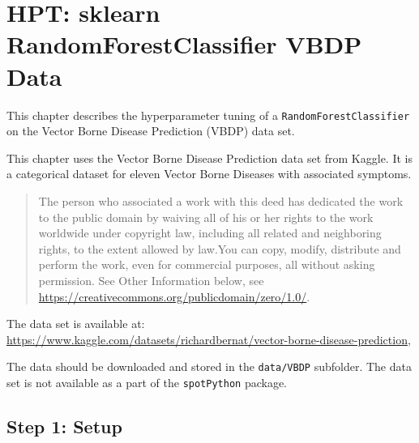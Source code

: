 \documentclass[
  letterpaper,
  DIV=11,
  numbers=noendperiod]{scrreprt}
\begin{document}
\hypertarget{sec-hpt-random-forest-classifier}{%
\chapter{HPT: sklearn RandomForestClassifier VBDP
Data}\label{sec-hpt-random-forest-classifier}}

This chapter describes the hyperparameter tuning of a
\texttt{RandomForestClassifier} on the Vector Borne Disease Prediction
(VBDP) data set.

\begin{tcolorbox}[enhanced jigsaw, left=2mm, title=\textcolor{quarto-callout-important-color}{\faExclamation}\hspace{0.5em}{Vector Borne Disease Prediction Data Set}, bottomrule=.15mm, titlerule=0mm, breakable, rightrule=.15mm, toprule=.15mm, coltitle=black, colbacktitle=quarto-callout-important-color!10!white, leftrule=.75mm, arc=.35mm, colframe=quarto-callout-important-color-frame, bottomtitle=1mm, colback=white, opacitybacktitle=0.6, toptitle=1mm, opacityback=0]

This chapter uses the Vector Borne Disease Prediction data set from
Kaggle. It is a categorical dataset for eleven Vector Borne Diseases
with associated symptoms.

\begin{quote}
The person who associated a work with this deed has dedicated the work
to the public domain by waiving all of his or her rights to the work
worldwide under copyright law, including all related and neighboring
rights, to the extent allowed by law.You can copy, modify, distribute
and perform the work, even for commercial purposes, all without asking
permission. See Other Information below, see
\url{https://creativecommons.org/publicdomain/zero/1.0/}.
\end{quote}

The data set is available at:
\url{https://www.kaggle.com/datasets/richardbernat/vector-borne-disease-prediction},

The data should be downloaded and stored in the \texttt{data/VBDP}
subfolder. The data set is not available as a part of the
\texttt{spotPython} package.

\end{tcolorbox}

\hypertarget{sec-setup-16}{%
\section{Step 1: Setup}\label{sec-setup-16}}
\end{document}
